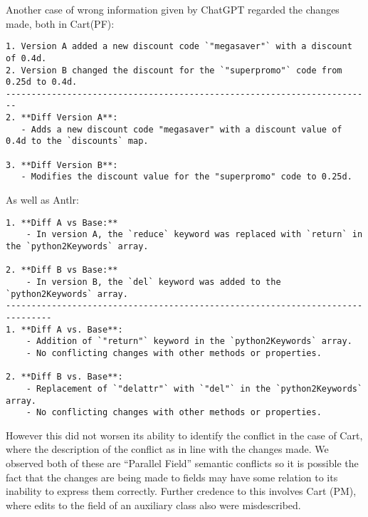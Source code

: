 Another case of wrong information given by ChatGPT regarded the changes made, both in Cart(PF):
\begin{lstlisting}
1. Version A added a new discount code `"megasaver"` with a discount of 0.4d.
2. Version B changed the discount for the `"superpromo"` code from 0.25d to 0.4d.
------------------------------------------------------------------------
2. **Diff Version A**:
   - Adds a new discount code "megasaver" with a discount value of 0.4d to the `discounts` map.

3. **Diff Version B**:
   - Modifies the discount value for the "superpromo" code to 0.25d.
\end{lstlisting}
As well as Antlr:
\begin{lstlisting}
1. **Diff A vs Base:**
    - In version A, the `reduce` keyword was replaced with `return` in the `python2Keywords` array.
 
2. **Diff B vs Base:**
    - In version B, the `del` keyword was added to the `python2Keywords` array.
-------------------------------------------------------------------------------
1. **Diff A vs. Base**:
    - Addition of `"return"` keyword in the `python2Keywords` array.
    - No conflicting changes with other methods or properties.
 
2. **Diff B vs. Base**:
    - Replacement of `"delattr"` with `"del"` in the `python2Keywords` array.
    - No conflicting changes with other methods or properties.
\end{lstlisting}
However this did not worsen its ability to identify the conflict in the case of Cart, where the description of the conflict as in line with the changes made.
We observed both of these are ``Parallel Field'' semantic conflicts so it is possible the fact that the changes are being made to fields may have some relation to its inability to express them correctly. Further credence to this involves Cart (PM), where edits to the field of an auxiliary class also were misdescribed.

